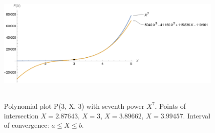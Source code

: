 ﻿\begin{figure}[H]
    \centering
    \includegraphics[width=1\textwidth]{sections/images/05_plots_polynomial_p3_n3_with_seventh}
    ~\caption{Polynomial plot P(3, X, 3) with seventh power $X^7$.
    Points of intersection $X=2.87643$, $X=3$, $X=3.89662$, $X=3.99457$.
    Interval of convergence: $a \leq X \leq b$.
    }\label{fig:figure11}
\end{figure}
